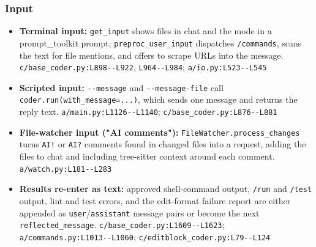 \subsubsection*{Input}
\begin{itemize}
\item \textbf{Terminal input:} \texttt{get\_\allowbreak{}input} shows files in chat and the mode in a prompt\_toolkit prompt; \texttt{preproc\_\allowbreak{}user\_\allowbreak{}input} dispatches \texttt{/\allowbreak{}commands}, scans the text for file mentions, and offers to scrape URLs into the message. \texttt{c/\allowbreak{}base\_\allowbreak{}coder.\allowbreak{}py:\allowbreak{}L898-\allowbreak{}-\allowbreak{}L922}, \texttt{L964-\allowbreak{}-\allowbreak{}L984}; \texttt{a/\allowbreak{}io.\allowbreak{}py:\allowbreak{}L523-\allowbreak{}-\allowbreak{}L545}
\item \textbf{Scripted input:} \texttt{-\allowbreak{}-\allowbreak{}message} and \texttt{-\allowbreak{}-\allowbreak{}message-\allowbreak{}file} call \texttt{coder.\allowbreak{}run(\allowbreak{}with\_\allowbreak{}message=.\allowbreak{}.\allowbreak{}.\allowbreak{})}, which sends one message and returns the reply text. \texttt{a/\allowbreak{}main.\allowbreak{}py:\allowbreak{}L1126-\allowbreak{}-\allowbreak{}L1140}; \texttt{c/\allowbreak{}base\_\allowbreak{}coder.\allowbreak{}py:\allowbreak{}L876-\allowbreak{}-\allowbreak{}L881}
\item \textbf{File-watcher input ("AI comments"):} \texttt{FileWatcher.\allowbreak{}process\_\allowbreak{}changes} turns \texttt{AI!} or \texttt{AI?} comments found in changed files into a request, adding the files to chat and including tree-sitter context around each comment. \texttt{a/\allowbreak{}watch.\allowbreak{}py:\allowbreak{}L181-\allowbreak{}-\allowbreak{}L283}
\item \textbf{Results re-enter as text:} approved shell-command output, \texttt{/\allowbreak{}run} and \texttt{/\allowbreak{}test} output, lint and test errors, and the edit-format failure report are either appended as \texttt{user}/\texttt{assistant} message pairs or become the next \texttt{reflected\_\allowbreak{}message}. \texttt{c/\allowbreak{}base\_\allowbreak{}coder.\allowbreak{}py:\allowbreak{}L1609-\allowbreak{}-\allowbreak{}L1623}; \texttt{a/\allowbreak{}commands.\allowbreak{}py:\allowbreak{}L1013-\allowbreak{}-\allowbreak{}L1060}; \texttt{c/\allowbreak{}editblock\_\allowbreak{}coder.\allowbreak{}py:\allowbreak{}L79-\allowbreak{}-\allowbreak{}L124}
\end{itemize}

